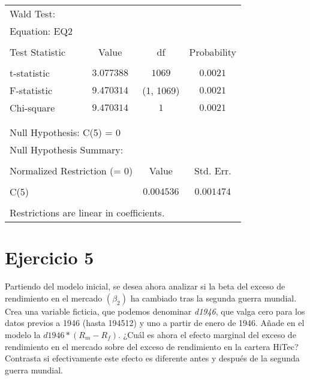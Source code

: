 \documentclass[12pt]{article}
\numberwithin{equation}{section} %
\begin{document}
\begin{table}[!htbp]
\centering
\begin{tabular}{lrrr}
\multicolumn{1}{l}{Wald Test:}&\multicolumn{1}{c}{}&\multicolumn{1}{c}{}&\multicolumn{1}{c}{}\\
\multicolumn{2}{l}{Equation: EQ2}&\multicolumn{1}{c}{}&\multicolumn{1}{c}{}\\
[4.5pt] \hline \\ [-4.5pt]
\multicolumn{1}{l}{Test Statistic}&\multicolumn{1}{c}{Value}&\multicolumn{1}{c}{df}&\multicolumn{1}{c}{Probability}\\
[4.5pt] \hline \\ [-4.5pt]
\multicolumn{1}{l}{t-statistic}&\multicolumn{1}{c}{$3.077388$}&\multicolumn{1}{c}{$1069$}&\multicolumn{1}{c}{$0.0021$}\\
\multicolumn{1}{l}{F-statistic}&\multicolumn{1}{c}{$9.470314$}&\multicolumn{1}{c}{(1, 1069)}&\multicolumn{1}{c}{$0.0021$}\\
\multicolumn{1}{l}{Chi-square}&\multicolumn{1}{c}{$9.470314$}&\multicolumn{1}{c}{$1$}&\multicolumn{1}{c}{$0.0021$}\\
[4.5pt] \hline \\ [-4.5pt]
\multicolumn{1}{c}{}&\multicolumn{1}{c}{}&\multicolumn{1}{c}{}&\multicolumn{1}{c}{}\\
\multicolumn{2}{l}{Null Hypothesis: C(5) = 0}&\multicolumn{1}{c}{}&\multicolumn{1}{c}{}\\
\multicolumn{2}{l}{Null Hypothesis Summary:}&\multicolumn{1}{c}{}&\multicolumn{1}{c}{}\\
[4.5pt] \hline \\ [-4.5pt]
\multicolumn{2}{l}{Normalized Restriction (= 0)}&\multicolumn{1}{c}{Value}&\multicolumn{1}{c}{Std. Err.}\\
[4.5pt] \hline \\ [-4.5pt]
\multicolumn{2}{l}{C(5)}&\multicolumn{1}{c}{$0.004536$}&\multicolumn{1}{c}{$0.001474$}\\
[4.5pt] \hline \\ [-4.5pt]
\multicolumn{3}{l}{Restrictions are linear in coefficients.}&\multicolumn{1}{c}{}\\
\end{tabular}
\end{table}


\section{Ejercicio 5} Partiendo del modelo inicial, se desea ahora analizar si la beta del exceso de rendimiento en el mercado $(\beta_2)$ ha cambiado tras la segunda guerra mundial. Crea una variable ficticia, que podemos denominar \textit{d1946}, que valga cero para los datos previos a 1946 (hasta 194512) y uno a partir de enero de 1946. Añade en el modelo la $d1946*(R_m-R_f)$. ¿Cuál es ahora el efecto marginal del exceso de rendimiento en el mercado sobre del exceso de rendimiento en la cartera HiTec? Contrasta si efectivamente este efecto es diferente antes y después de la segunda guerra mundial.
\end{document}
